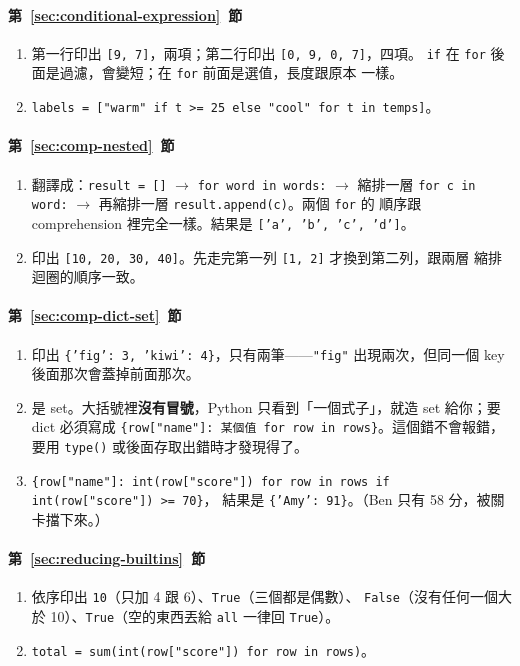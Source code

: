 \paragraph{第~\ref{sec:conditional-expression}~節}
\begin{enumerate}
\item 第一行印出 \texttt{[9, 7]}，兩項；第二行印出 \texttt{[0, 9, 0, 7]}，四項。
\texttt{if} 在 \texttt{for} 後面是過濾，會變短；在 \texttt{for} 前面是選值，長度跟原本
一樣。
\item \texttt{labels = ["warm" if t >= 25 else "cool" for t in temps]}。
\end{enumerate}

\paragraph{第~\ref{sec:comp-nested}~節}
\begin{enumerate}
\item 翻譯成：\texttt{result = []} $\to$ \texttt{for word in words:} $\to$ 縮排一層
\texttt{for c in word:} $\to$ 再縮排一層 \texttt{result.append(c)}。兩個 \texttt{for} 的
順序跟 comprehension 裡完全一樣。結果是 \texttt{['a', 'b', 'c', 'd']}。
\item 印出 \texttt{[10, 20, 30, 40]}。先走完第一列 \texttt{[1, 2]} 才換到第二列，跟兩層
縮排迴圈的順序一致。
\end{enumerate}

\paragraph{第~\ref{sec:comp-dict-set}~節}
\begin{enumerate}
\item 印出 \texttt{\{'fig': 3, 'kiwi': 4\}}，只有兩筆——\texttt{"fig"} 出現兩次，但同一個
key 後面那次會蓋掉前面那次。
\item 是 set。大括號裡\textbf{沒有冒號}，Python 只看到「一個式子」，就造 set 給你；要
dict 必須寫成 \texttt{\{row["name"]: 某個值 for row in rows\}}。這個錯不會報錯，要用
\texttt{type()} 或後面存取出錯時才發現得了。
\item \texttt{\{row["name"]: int(row["score"]) for row in rows if int(row["score"]) >= 70\}}，
結果是 \texttt{\{'Amy': 91\}}。（Ben 只有 58 分，被關卡擋下來。）
\end{enumerate}

\paragraph{第~\ref{sec:reducing-builtins}~節}
\begin{enumerate}
\item 依序印出 \texttt{10}（只加 4 跟 6）、\texttt{True}（三個都是偶數）、
\texttt{False}（沒有任何一個大於 10）、\texttt{True}（空的東西丟給 \texttt{all} 一律回
\texttt{True}）。
\item \texttt{total = sum(int(row["score"]) for row in rows)}。
\end{enumerate}

